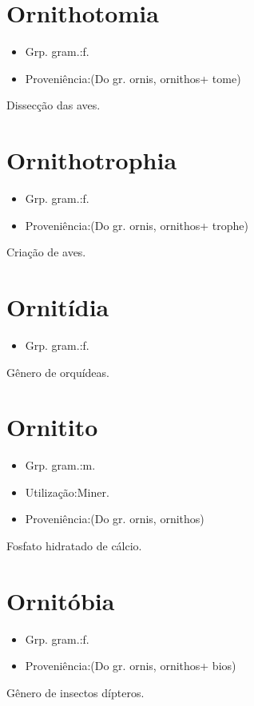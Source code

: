 \section{Ornithotomia}
\begin{itemize}
\item {Grp. gram.:f.}
\end{itemize}
\begin{itemize}
\item {Proveniência:(Do gr. \textunderscore ornis\textunderscore , \textunderscore ornithos\textunderscore  + \textunderscore tome\textunderscore )}
\end{itemize}
Dissecção das aves.
\section{Ornithotrophia}
\begin{itemize}
\item {Grp. gram.:f.}
\end{itemize}
\begin{itemize}
\item {Proveniência:(Do gr. \textunderscore ornis\textunderscore , \textunderscore ornithos\textunderscore  + \textunderscore trophe\textunderscore )}
\end{itemize}
Criação de aves.
\section{Ornitídia}
\begin{itemize}
\item {Grp. gram.:f.}
\end{itemize}
Gênero de orquídeas.
\section{Ornitito}
\begin{itemize}
\item {Grp. gram.:m.}
\end{itemize}
\begin{itemize}
\item {Utilização:Miner.}
\end{itemize}
\begin{itemize}
\item {Proveniência:(Do gr. \textunderscore ornis\textunderscore , \textunderscore ornithos\textunderscore )}
\end{itemize}
Fosfato hidratado de cálcio.
\section{Ornitóbia}
\begin{itemize}
\item {Grp. gram.:f.}
\end{itemize}
\begin{itemize}
\item {Proveniência:(Do gr. \textunderscore ornis\textunderscore , \textunderscore ornithos\textunderscore  + \textunderscore bios\textunderscore )}
\end{itemize}
Gênero de insectos dípteros.
